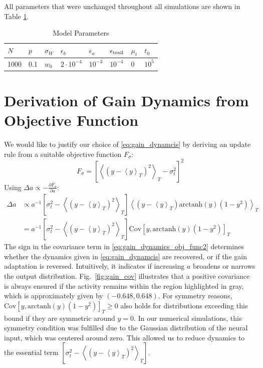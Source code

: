 \documentclass[10pt,a4paper]{article}
\newcommand{\avgt}[1]{\left< #1 \right>_T}
\begin{document}
All parameters that were unchanged throughout all simulations are shown in Table \ref{tab:params}.

\begin{table}[h]
	\caption{Model Parameters}
	\centering
	\vspace{5pt}
	\begin{tabular}{ l | l | l | l | l | l | l | l }
		 $N$ & $p$ & $\sigma_{W}$ & $\epsilon_{b}$ & $\epsilon_{a}$ & $\epsilon_{\rm trail}$ & $\mu_{t}$ & $t_0$  \\
		\hline
		\hline
		\rule{0pt}{12pt}
		1000 & 0.1 & $ w_0 $ & $2\cdot 10^{-4}$ & $10^{-3}$ & $10^{-4}$ & 0 & $10^5$
	\end{tabular}
	\label{tab:params}
\end{table}

\section{Derivation of Gain Dynamics from Objective Function}
We would like to justify our choice of \eqref{eq:gain_dynamcis} by deriving an update rule from a suitable objective function $F_{\sigma}$:
\begin{equation}
F_{\sigma} = \left[\avgt{\left(y-\avgt{y}\right)^2} - \sigma^2_{t}\right]^2
\end{equation}
Using $\Delta a \propto - \frac{\partial F_\sigma}{\partial a}$:
\begin{align}
\Delta a &\propto a^{-1} \left[\sigma^2_{t} - \avgt{\left(y-\avgt{y}\right)^2}\right]\avgt{\left(y-\avgt{y}\right)\mathrm{arctanh}(y)\left(1-y^2\right)} \label{eq:gain_dynamics_obj_func1} \\
&=a^{-1} \left[\sigma^2_{t} - \avgt{\left(y-\avgt{y}\right)^2}\right]\mathrm{Cov}\left[ y,\mathrm{arctanh}(y)\left(1-y^2\right) \right]_T \label{eq:gain_dynamics_obj_func2}
\end{align}
The sign in the covariance term in \eqref{eq:gain_dynamics_obj_func2} determines whether the dynamics given in \eqref{eq:gain_dynamcis} are recovered, or if the gain adaptation is reversed. Intuitively, it indicates if increasing $a$ broadens or narrows the output distribution. Fig.~\ref{fig:gain_cov} illustrates that a positive covariance is always ensured if the activity remains within the region highlighted in gray, which is approximately given by $(-0.648,0.648)$. For symmetry reasons, $\mathrm{Cov}\left[ y,\mathrm{arctanh}(y)\left(1-y^2\right) \right]_T \geq 0$ also holds for distributions exceeding this bound if they are symmetric around $y=0$. In our numerical simulations, this symmetry condition was fulfilled due to the Gaussian distribution of the neural input, which was centered around zero. This allowed us to reduce dynamics to the essential term $\left[\sigma^2_{t} - \avgt{\left(y-\avgt{y}\right)^2}\right]$.
\end{document}

